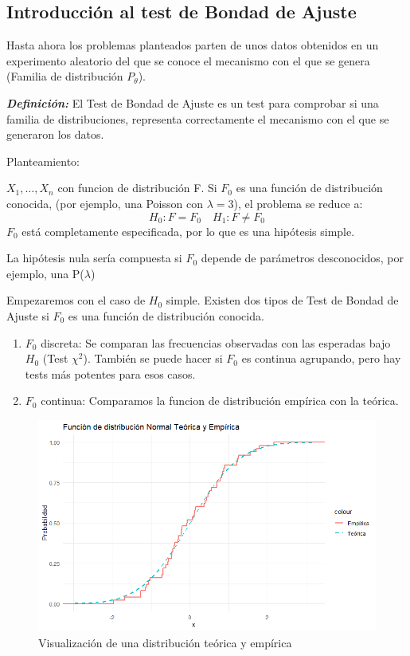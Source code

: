 \subsection{Introducción al test de Bondad de Ajuste}

Hasta ahora los problemas planteados parten de unos datos obtenidos
en un experimento aleatorio del que se conoce el mecanismo con el que se genera (Familia de distribución $P_\theta$).

\textit{\textbf{Definición: }}El Test de Bondad de Ajuste es un test para comprobar si una familia de distribuciones,
 representa correctamente el mecanismo con el que se generaron los datos.

Planteamiento:

$X_1,\dots,X_n$ con funcion de distribución F. Si $F_0$ es una función de distribución conocida, (por ejemplo, una Poisson con $\lambda=3$), el problema se reduce a:
\[
    H_0: F=F_0 \quad H_1: F \neq F_0
\]
$F_0$ está completamente especificada, por lo que es una hipótesis simple.

La hipótesis nula sería compuesta si $F_0$ depende de parámetros desconocidos, por ejemplo, una P($\lambda$)

Empezaremos con el caso de $H_0$ simple. Existen dos tipos de Test de Bondad de Ajuste si $F_0$ es una función de  distribución conocida.
\begin{enumerate}
    \item $F_0$ discreta: Se comparan las frecuencias observadas con las esperadas bajo $H_0$ (Test $\chi^2$). También se puede hacer si $F_0$ es continua agrupando, pero hay tests más potentes para esos casos.
    \item $F_0$ continua: Comparamos la funcion de distribución empírica con la teórica.
\end{enumerate}

\begin{figure}[h!]
    \centering
    \includegraphics[width=\textwidth]{assets/Tema4/TeoricaEmpirica.png}
    \caption{Visualización de una distribución teórica y empírica}
    \label{fig:theorical_vs_empirical}
\end{figure}

